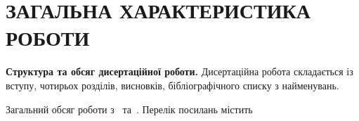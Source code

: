 \chapter*{ЗАГАЛЬНА ХАРАКТЕРИСТИКА РОБОТИ}

\newcommand{\actuality}{\textbf{Актуальність теми дослідження.}}
\newcommand{\relationship}{\textbf{Зв’язок роботи з науковими програмами, планами, темами.}}
\newcommand{\aim}{\textbf{Мета і задачі дослідження.}}
\newcommand{\objectofstudy}{\textit{Об’єктом дослідження}}
\newcommand{\subjectofstudy}{\textit{Предметом дослідження}}
\newcommand{\methodofstudy}{\textit{Методи дослідження.}}
\newcommand{\defpositions}{\textbf{Основні положення для захисту}}
\newcommand{\novelty}{\textbf{Наукова новизна одержаних результатів.}}
\newcommand{\influence}{\textbf{Практичне значення одержаних результатів.}}
\newcommand{\probation}{\textbf{Апробація результатів дисертації.}}
\newcommand{\contribution}{\textbf{Особистий внесок здобувача.}}
\newcommand{\publications}{\textbf{Публікації.}}




\textbf{Структура та обсяг дисертаційної роботи.} Дисертаційна робота складається із вступу, чотирьох розділів,
висновків, бібліографічного списку з  найменувань.

Загальний обсяг роботи
з~
та~. Перелік посилань містить

\vspace{0pt plus1fill}
